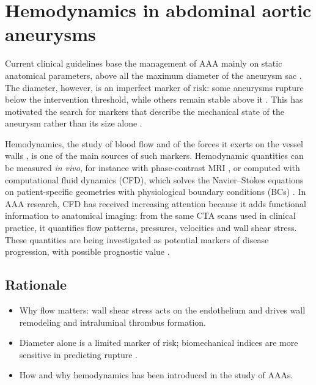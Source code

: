 
\section{Hemodynamics in abdominal aortic aneurysms}
\label{sec:hemo-aaa}
Current clinical guidelines base the management of AAA mainly on static anatomical parameters, above all the maximum diameter of the aneurysm sac \cite{wanhainen_editors_2024}. The diameter, however, is an imperfect marker of risk: some aneurysms rupture below the intervention threshold, while others remain stable above it \cite{varkevisser_midterm_2020}. This has motivated the search for markers that describe the mechanical state of the aneurysm rather than its size alone \cite{polzer_biomechanical_2020}.

Hemodynamics, the study of blood flow and of the forces it exerts on the vessel walls \cite{secomb_hemodynamics_2016}, is one of the main sources of such markers. Hemodynamic quantities can be measured \textit{in vivo}, for instance with phase-contrast MRI \cite{les_quantification_2010}, or computed with computational fluid dynamics (CFD), which solves the Navier--Stokes equations on patient-specific geometries with physiological boundary conditions (BCs) \cite{katsoudas_hemodynamic_2026}. In AAA research, CFD has received increasing attention because it adds functional information to anatomical imaging: from the same CTA scans used in clinical practice, it quantifies flow patterns, pressures, velocities and wall shear stress. These quantities are being investigated as potential markers of disease progression, with possible prognostic value \cite{bonfanti_personalised_nodate}.
\subsection{Rationale}
\begin{itemize}
    \item Why flow matters: wall shear stress acts on the endothelium and drives wall remodeling and intraluminal thrombus formation. \citeneeded{}
    \item Diameter alone is a limited marker of risk; biomechanical indices are more sensitive in predicting rupture \cite{polzer_biomechanical_2020}.
    \item How and why hemodynamics has been introduced in the study of AAAs. \citeneeded{}
\end{itemize}

